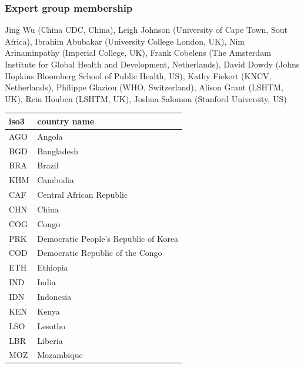 \documentclass[12pt]{article}
\begin{document}
\subsubsection*{Expert group membership}

Jing Wu (China CDC, China), Leigh Johnson (University of Cape Town, Sout
Africa), Ibrahim Abubakar (University College London, UK), Nim Arinaminpathy (Imperial College,
UK), Frank Cobelens (The Amsterdam Institute for Global Health and Development, Netherlands),
David Dowdy (Johns Hopkins Bloomberg School of Public Health, US), Kathy Fiekert
(KNCV, Netherlands), Philippe Glaziou (WHO, Switzerland),
Alison Grant (LSHTM, UK), Rein Houben (LSHTM, UK), Joshua Salomon (Stanford University, US)


\begin{table}[]
  \centering
\begin{tabular}{|l|l|}
\hline
\textbf{iso3} & \textbf{country name}                 \\ \hline
AGO           & Angola                                \\ \hline
BGD           & Bangladesh                            \\ \hline
BRA           & Brazil                                \\ \hline
KHM           & Cambodia                              \\ \hline
CAF           & Central African Republic              \\ \hline
CHN           & China                                 \\ \hline
COG           & Congo                                 \\ \hline
PRK           & Democratic People's Republic of Korea \\ \hline
COD           & Democratic Republic of the Congo      \\ \hline
ETH           & Ethiopia                              \\ \hline
IND           & India                                 \\ \hline
IDN           & Indonesia                             \\ \hline
KEN           & Kenya                                 \\ \hline
LSO           & Lesotho                               \\ \hline
LBR           & Liberia                               \\ \hline
MOZ           & Mozambique                            \\ \hline

\end{tabular}
\end{table}
\end{document}
